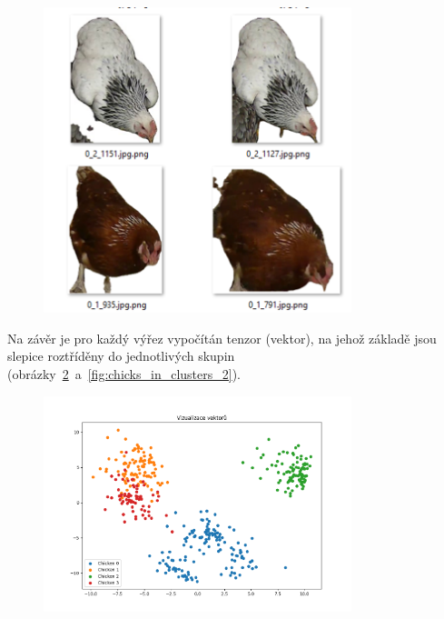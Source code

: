 \begin{figure}[H]
    \centering
    \includegraphics[width=0.8\textwidth]{img/segmented_chicks}
    \label{fig:segmented_chicks2}
\end{figure}

Na závěr je pro každý výřez vypočítán tenzor (vektor), na jehož základě jsou slepice roztříděny do jednotlivých skupin (obrázky~\ref{fig:chicks_in_clusters}~a~\ref{fig:chicks_in_clusters_2}).

\begin{figure}[H]
    \centering
    \includegraphics[width=0.8\textwidth]{img/chicks_in_clusters}
    \label{fig:chicks_in_clusters}
\end{figure}

